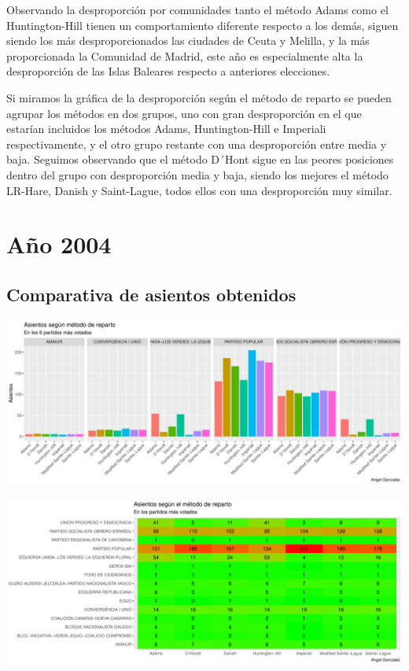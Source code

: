 \documentclass[12pt,a4paper,]{book}
\numberwithin{dummy}{section}
\theoremstyle{ocrenumbox}
\theoremstyle{blacknumex}
\theoremstyle{blacknumbox}
\theoremstyle{ocrenum}
\theoremstyle{ocrenum}
\begin{document}
Observando la desproporción por comunidades tanto el método Adams como
el Huntington-Hill tienen un comportamiento diferente respecto a los
demás, siguen siendo los más desproporcionados las ciudades de Ceuta y
Melilla, y la más proporcionada la Comunidad de Madrid, este año es
especialmente alta la desproporción de las Islas Baleares respecto a
anteriores elecciones.

Si miramos la gráfica de la desproporción según el método de reparto se
pueden agrupar los métodos en dos grupos, uno con gran desproporción en
el que estarían incluidos los métodos Adams, Huntington-Hill e Imperiali
respectivamente, y el otro grupo restante con una desproporción entre
media y baja. Seguimos observando que el método D´Hont sigue en las
peores posiciones dentro del grupo con desproporción media y baja,
siendo los mejores el método LR-Hare, Danish y Saint-Lague, todos ellos
con una desproporción muy similar.

\hypertarget{auxf1o-2004}{%
\section{Año 2004}\label{auxf1o-2004}}

\hypertarget{comparativa-de-asientos-obtenidos-8}{%
\subsection{Comparativa de asientos
obtenidos}\label{comparativa-de-asientos-obtenidos-8}}

\begin{center}\includegraphics[width=1\linewidth]{figurasR/unnamed-chunk-100-1} \end{center}

\begin{center}\includegraphics[width=1\linewidth]{figurasR/unnamed-chunk-100-2} \end{center}
\end{document}
